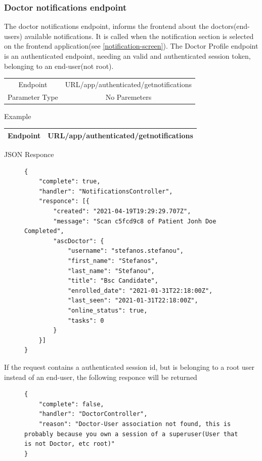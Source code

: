 				\subsubsection{Doctor notifications endpoint}
					The doctor notifications endpoint, informs the frontend about the doctors(end-users) available notifications. 
					It is called when the notification section is selected on the frontend application(see \ref{notification-screen}). 
					The Doctor Profile endpoint is an authenticated endpoint, needing an valid and authenticated session token, 
					belonging to an end-user(not root).
					\begin{center}
						\begin{tabular}{ |c|c| } 
							\hline
							Endpoint & {{URL}}/app/authenticated/getnotifications\\
							Parameter Type & No Paremeters  \\
							\hline
						\end{tabular}
					\end{center}
					Example
					\begin{center}
						\begin{tabular}{ |c|c| } 
							\hline
							Endpoint & {{URL}}/app/authenticated/getnotifications\\
							\hline
						\end{tabular}
					\end{center}
					JSON Responce
					\begin{figure}[H]
						\iftrue
						\begin{lstlisting}[]
{
	"complete": true,
	"handler": "NotificationsController",
	"responce": [{
		"created": "2021-04-19T19:29:29.707Z",
		"message": "Scan c5fcd9c8 of Patient Jonh Doe Completed",
		"ascDoctor": {
			"username": "stefanos.stefanou",
			"first_name": "Stefanos",
			"last_name": "Stefanou",
			"title": "Bsc Candidate",
			"enrolled_date": "2021-01-31T22:18:00Z",
			"last_seen": "2021-01-31T22:18:00Z",
			"online_status": true,
			"tasks": 0
		}
	}]
}
						\end{lstlisting}
					\end{figure}
					If the request contains a authenticated session id, but is belonging to a root user instead of an end-user, the
					following responce will be returned
					\begin{figure}[H]
						\iftrue
						\begin{lstlisting}[]
{
	"complete": false,
	"handler": "DoctorController",
	"reason": "Doctor-User association not found, this is probably because you own a session of a superuser(User that is not Doctor, etc root)"
}
						\end{lstlisting}
					\end{figure}
